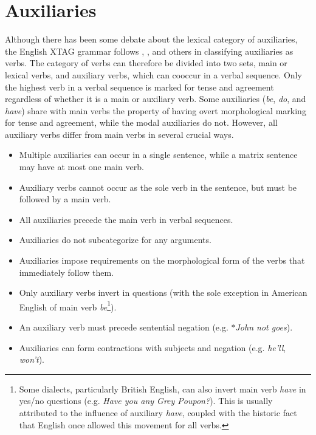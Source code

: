 \chapter{Auxiliaries}
\label{auxiliaries}

Although there has been some debate about the lexical category of auxiliaries,
the English XTAG grammar follows \cite{mccawley88}, \cite{haegeman91}, and
others in classifying auxiliaries as verbs. The category of verbs can therefore
be divided into two sets, main or lexical verbs, and auxiliary verbs, which can
cooccur in a verbal sequence.  Only the highest verb in a verbal sequence is
marked for tense and agreement regardless of whether it is a main or auxiliary
verb.  Some auxiliaries ({\it be}, {\it do}, and {\it have}) share with main
verbs the property of having overt morphological marking for tense and
agreement, while the modal auxiliaries do not.  However, all auxiliary verbs
differ from main verbs in several crucial ways.

\begin{itemize}

\item Multiple auxiliaries can occur in a single sentence, while a matrix
sentence may have at most one main verb. 

\item Auxiliary verbs cannot occur as the sole verb in the sentence, but must
be followed by a main verb.

\item All auxiliaries precede the main verb in verbal sequences.

\item Auxiliaries do not subcategorize for any arguments.

\item Auxiliaries impose requirements on the morphological form of the verbs
that immediately follow them.

\item Only auxiliary verbs invert in questions (with the sole exception in 
American English of main verb {\it be}\footnote{Some dialects, particularly
British English, can also invert main verb {\it have} in yes/no questions
(e.g. {\it Have you any Grey Poupon?}).  This is usually attributed to the
influence of auxiliary {\it have}, coupled with the historic fact that English
once allowed this movement for all verbs.\label{have-footnote}}).

\item An auxiliary verb must precede sentential negation (e.g. $\ast${\it John not goes}).

\item Auxiliaries can form contractions with subjects and negation (e.g. {\it
he'll}, {\it won't}).

\end{itemize}


